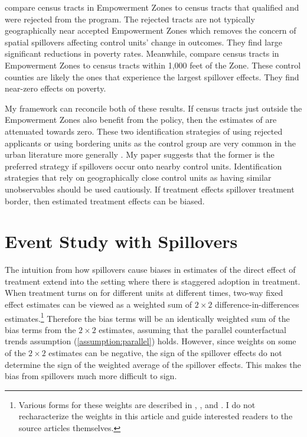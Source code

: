 \documentclass[11pt]{article}
\begin{document}
\citet{Busso_Gregory_Kline_2013} compare census tracts in Empowerment Zones to census tracts that qualified and were rejected from the program. The rejected tracts are not typically geographically near accepted Empowerment Zones which removes the concern of spatial spillovers affecting control units' change in outcomes. They find large significant reductions in poverty rates. Meanwhile, \citet{Neumark_Kolko_2010} compare census tracts in Empowerment Zones to census tracts within 1,000 feet of the Zone. These control counties are likely the ones that experience the largest spillover effects. They find near-zero effects on poverty. 

My framework can reconcile both of these results. If census tracts just outside the Empowerment Zones also benefit from the policy, then the estimates of \citet{Neumark_Kolko_2010} are attenuated towards zero. These two identification strategies of using rejected applicants or using bordering units as the control group are very common in the urban literature more generally \citep{Baum-Snow_Ferreira_2015}. My paper suggests that the former is the preferred strategy if spillovers occur onto nearby control units. Identification strategies that rely on geographically close control units as having similar unobservables should be used cautiously. If treatment effects spillover treatment border, then estimated treatment effects can be biased.



\section{Event Study with Spillovers}
\label{sec:event_study}

The intuition from how spillovers cause biases in estimates of the direct effect of treatment extend into the setting where there is staggered adoption in treatment. When treatment turns on for different units at different times, two-way fixed effect estimates can be viewed as a weighted sum of $2 \times 2$ difference-in-differences estimates.\footnote{Various forms for these weights are described in \citet{Goodman-Bacon_2018}, \citet{Sun_Abraham_2020}, and \citet{deChaisemartin_DHaultfoeuille_2019}. I do not recharacterize the weights in this article and guide interested readers to the source articles themselves.} Therefore the bias terms will be an identically weighted sum of the bias terms from the $2 \times 2$ estimates, assuming that the parallel counterfactual trends assumption (\ref{assumption:parallel}) holds. However, since weights on some of the $2 \times 2$ estimates can be negative, the sign of the spillover effects do not determine the sign of the weighted average of the spillover effects. This makes the bias from spillovers much more difficult to sign. 
\end{document}
